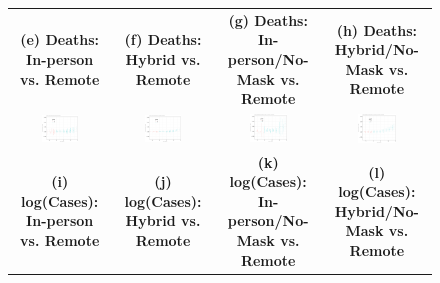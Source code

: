 \documentclass[9pt,twocolumn,twoside,lineno]{pnas-new}
\begin{document}
\begin{figure}[!ht]
{\begin{minipage}{\linewidth}
\begin{tabular}{cccc}
\textbf{\large (e) Deaths: In-person vs. Remote  }&\textbf{\large (f) Deaths:  Hybrid vs. Remote }&\textbf{\large (g) Deaths: In-person/No-Mask vs. Remote }&\textbf{\large (h) Deaths:  Hybrid/No-Mask vs. Remote  }\smallskip\\
 \includegraphics[width=0.4\textwidth]{event_deaths_csfull.pdf}& \includegraphics[width=0.4\textwidth]{event_deaths_cshybrid.pdf}  &
  \includegraphics[width=0.4\textwidth]{event_deaths_csfullno.pdf}& \includegraphics[width=0.4\textwidth]{event_deaths_cshybridno.pdf} \smallskip\\
\textbf{\large (i) log(Cases): In-person vs. Remote }&\textbf{\large (j) log(Cases):  Hybrid vs. Remote }&\textbf{\large (k) log(Cases): In-person/No-Mask vs. Remote}&\textbf{\large (l) log(Cases):  Hybrid/No-Mask vs. Remote }\smallskip\\

\end{tabular}
\end{minipage}}
\end{figure}
\end{document}
